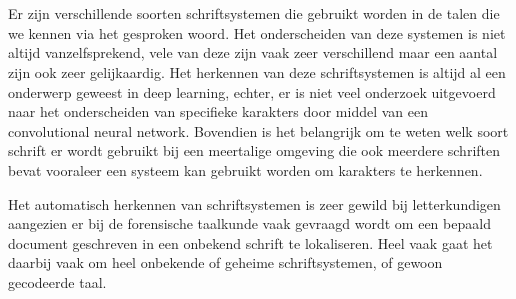 
\chapter{}
\label{ch:inleiding}



Er zijn verschillende soorten schriftsystemen die gebruikt worden in de talen die we kennen via het gesproken woord.
Het onderscheiden van deze systemen is niet altijd vanzelfsprekend, vele van deze zijn vaak zeer verschillend maar een aantal zijn ook zeer gelijkaardig.
Het herkennen van deze schriftsystemen is altijd al een onderwerp geweest in deep learning, echter, er is niet veel onderzoek uitgevoerd naar het onderscheiden van specifieke karakters door middel van een convolutional neural network. 
Bovendien is het belangrijk om te weten welk soort schrift er wordt gebruikt bij een meertalige omgeving die ook meerdere schriften bevat vooraleer een systeem kan gebruikt worden om karakters te herkennen.

Het automatisch herkennen van schriftsystemen is zeer gewild bij letterkundigen aangezien er bij de forensische taalkunde vaak gevraagd wordt om een bepaald document geschreven in een onbekend schrift te lokaliseren. Heel vaak gaat het daarbij vaak om heel onbekende of geheime schriftsystemen, of gewoon gecodeerde taal. 

